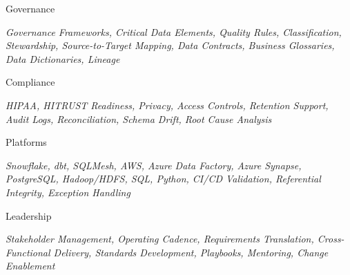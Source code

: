 
\begin{cvskills}    

\cvskill
    {Governance}
    {\begin{minipage}[t]{0.8\textwidth}
        \textit{Governance Frameworks, Critical Data Elements, Quality Rules, Classification, Stewardship, Source-to-Target Mapping, Data Contracts, Business Glossaries, Data Dictionaries, Lineage}
    \end{minipage}
    }

\cvskill
    {Compliance}
    {\begin{minipage}[t]{0.8\textwidth}
        \textit{HIPAA, HITRUST Readiness, Privacy, Access Controls, Retention Support, Audit Logs, Reconciliation, Schema Drift, Root Cause Analysis}
    \end{minipage}
    }

\cvskill
    {Platforms}
    {\begin{minipage}[t]{0.8\textwidth}
        \textit{Snowflake, dbt, SQLMesh, AWS, Azure Data Factory, Azure Synapse, PostgreSQL, Hadoop/HDFS, SQL, Python, CI/CD Validation, Referential Integrity, Exception Handling}
    \end{minipage}
    }

\cvskill
    {Leadership}
    {\begin{minipage}[t]{0.8\textwidth}
        \textit{Stakeholder Management, Operating Cadence, Requirements Translation, Cross-Functional Delivery, Standards Development, Playbooks, Mentoring, Change Enablement}
    \end{minipage}
    }

\end{cvskills}

